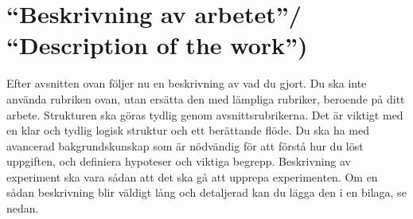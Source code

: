 \section{``Beskrivning av arbetet''/ ``Description of the work'') }

Efter avsnitten ovan f\"{o}ljer nu en beskrivning av vad du gjort. Du ska inte anv\"{a}nda rubriken ovan, utan ers\"{a}tta den med l\"{a}mpliga rubriker, beroende p\r{a} ditt arbete. Strukturen ska g\"{o}ras tydlig genom avsnittsrubrikerna. Det \"{a}r viktigt med en klar och tydlig logisk struktur och ett ber\"{a}ttande fl\"{o}de. Du ska ha med avancerad bakgrundskunskap som \"{a}r n\"{o}dv\"{a}ndig f\"{o}r att f\"{o}rst\r{a} hur du l\"{o}st uppgiften, och definiera hypoteser och viktiga begrepp. Beskrivning av experiment ska vara s\r{a}dan att det ska g\r{a} att upprepa experimenten. Om en s\r{a}dan beskrivning blir v\"{a}ldigt l\r{a}ng och detaljerad kan du l\"{a}gga den i en bilaga, se nedan.  


